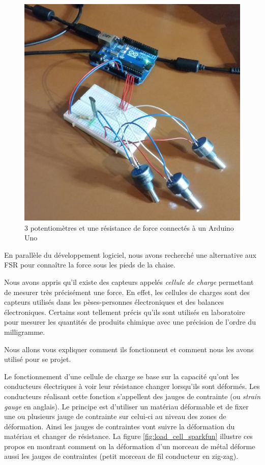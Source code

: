 \documentclass{polytech/polytech}
\begin{document}
\begin{figure}[htbp]
\begin{center}
\includegraphics[scale=0.6]{image/Arduino_v0.jpg}
\end{center}
\caption{3 potentiomètres et une résistance de force connectés à un Arduino Uno}
\label{fig:arduino_v0}
\end{figure}

En parallèle du développement logiciel, nous avons recherché une alternative aux FSR pour connaître la force sous les pieds de la chaise. 

Nous avons appris qu'il existe des capteurs appelés \textit{cellule de charge} permettant de mesurer très précisément une force. En effet, les cellules de charges sont des capteurs utilisés dans les pèses-personnes électroniques et des balances électroniques. Certains sont tellement précis qu'ils sont utilisés en laboratoire pour mesurer les quantités de produits chimique avec une précision de l'ordre du milligramme.

Nous allons vous expliquer comment ils fonctionnent et comment nous les avons utilisé pour se projet.

Le fonctionnement d'une cellule de charge se base sur la capacité qu'ont les conducteurs électriques à voir leur résistance changer lorsqu'ils sont déformés. Les conducteurs réalisant cette fonction s'appellent des jauges de contrainte (ou \textit{strain gauge} en anglais). Le principe est d'utiliser un matériau déformable et de fixer une ou plusieurs jauge de contrainte sur celui-ci au niveau des zones de déformation. Ainsi les jauges de contraintes vont suivre la déformation du matériau et changer de résistance. La figure \ref{fig:load_cell_sparkfun} illustre ces propos en montrant comment on la déformation d'un morceau de métal déforme aussi les jauges de contraintes (petit morceau de fil conducteur en zig-zag).
\end{document}
